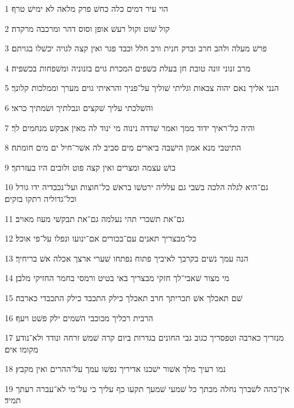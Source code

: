 \par 1 הוי עיר דמים כלה כחשׁ פרק מלאה לא ימישׁ טרף׃
\par 2 קול שׁוט וקול רעשׁ אופן וסוס דהר ומרכבה מרקדה׃
\par 3 פרשׁ מעלה ולהב חרב וברק חנית ורב חלל וכבד פגר ואין קצה לגויה יכשׁלו בגויתם׃
\par 4 מרב זנוני זונה טובת חן בעלת כשׁפים המכרת גוים בזנוניה ומשׁפחות בכשׁפיה׃
\par 5 הנני אליך נאם יהוה צבאות וגליתי שׁוליך על־פניך והראיתי גוים מערך וממלכות קלונך׃
\par 6 והשׁלכתי עליך שׁקצים ונבלתיך ושׂמתיך כראי׃
\par 7 והיה כל־ראיך ידוד ממך ואמר שׁדדה נינוה מי ינוד לה מאין אבקשׁ מנחמים לך׃
\par 8 התיטבי מנא אמון הישׁבה ביארים מים סביב לה אשׁר־חיל ים מים חומתה׃
\par 9 כושׁ עצמה ומצרים ואין קצה פוט ולובים היו בעזרתך׃
\par 10 גם־היא לגלה הלכה בשׁבי גם עלליה ירטשׁו בראשׁ כל־חוצות ועל־נכבדיה ידו גורל וכל־גדוליה רתקו בזקים׃
\par 11 גם־את תשׁכרי תהי נעלמה גם־את תבקשׁי מעוז מאויב׃
\par 12 כל־מבצריך תאנים עם־בכורים אם־ינועו ונפלו על־פי אוכל׃
\par 13 הנה עמך נשׁים בקרבך לאיביך פתוח נפתחו שׁערי ארצך אכלה אשׁ בריחיך׃
\par 14 מי מצור שׁאבי־לך חזקי מבצריך באי בטיט ורמסי בחמר החזיקי מלבן׃
\par 15 שׁם תאכלך אשׁ תכריתך חרב תאכלך כילק התכבד כילק התכבדי כארבה׃
\par 16 הרבית רכליך מכוכבי השׁמים ילק פשׁט ויעף׃
\par 17 מנזריך כארבה וטפסריך כגוב גבי החונים בגדרות ביום קרה שׁמשׁ זרחה ונודד ולא־נודע מקומו אים׃
\par 18 נמו רעיך מלך אשׁור ישׁכנו אדיריך נפשׁו עמך על־ההרים ואין מקבץ׃
\par 19 אין־כהה לשׁברך נחלה מכתך כל שׁמעי שׁמעך תקעו כף עליך כי על־מי לא־עברה רעתך תמיד׃


